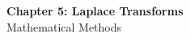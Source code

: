 \documentclass[12pt]{article}
\begin{document}
\begin{center}
  {\LARGE\bfseries Chapter 5: Laplace Transforms}\\[0.25em]
  {\large Mathematical Methods}\\[0.15em]
\end{center}

\end{document}
